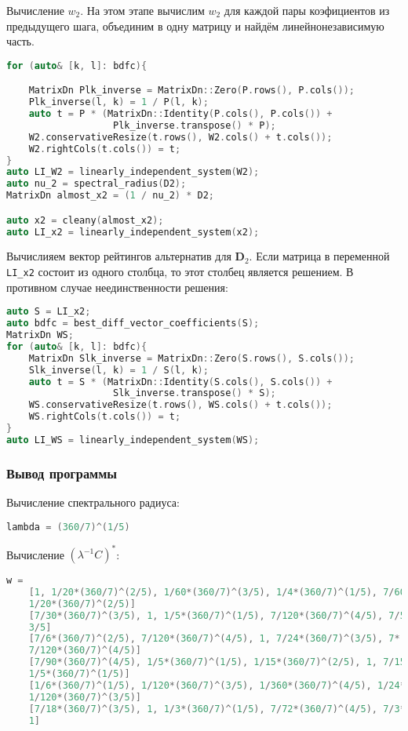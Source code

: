 \documentclass[specialist,
	substylefile = spbu.rtx,
	subf,href,colorlinks=true, 12pt]{disser}
\begin{document}
Вычисление $w_2$. На этом этапе вычислим $w_{2}$ для каждой пары коэфициентов из предыдущего шага, объединим в одну матрицу и найдём линейнонезависимую часть.
\begin{lstlisting}[language=c++,basicstyle=\footnotesize\ttfamily]
for (auto& [k, l]: bdfc){

    MatrixDn Plk_inverse = MatrixDn::Zero(P.rows(), P.cols());
    Plk_inverse(l, k) = 1 / P(l, k);
    auto t = P * (MatrixDn::Identity(P.cols(), P.cols()) +
                   Plk_inverse.transpose() * P);
    W2.conservativeResize(t.rows(), W2.cols() + t.cols());
    W2.rightCols(t.cols()) = t;
}
auto LI_W2 = linearly_independent_system(W2);
auto nu_2 = spectral_radius(D2);
MatrixDn almost_x2 = (1 / nu_2) * D2;

auto x2 = cleany(almost_x2);
auto LI_x2 = linearly_independent_system(x2);
\end{lstlisting}

Вычислияем вектор рейтингов альтернатив для $\mathbf{D}_2$.
Если матрица в переменной \texttt{LI\_x2} состоит из одного столбца, то этот столбец является решением. В противном случае неединственности решения:

\begin{lstlisting}[language=c++,basicstyle=\footnotesize\ttfamily]
auto S = LI_x2;
auto bdfc = best_diff_vector_coefficients(S);
MatrixDn WS;
for (auto& [k, l]: bdfc){
    MatrixDn Slk_inverse = MatrixDn::Zero(S.rows(), S.cols());
    Slk_inverse(l, k) = 1 / S(l, k);
    auto t = S * (MatrixDn::Identity(S.cols(), S.cols()) +
                   Slk_inverse.transpose() * S);
    WS.conservativeResize(t.rows(), WS.cols() + t.cols());
    WS.rightCols(t.cols()) = t;
}
auto LI_WS = linearly_independent_system(WS);
\end{lstlisting}

\subsubsection{Вывод программы}

Вычисление  спектрального радиуса:
\begin{lstlisting}[language=c++,basicstyle=\footnotesize\ttfamily]
	lambda = (360/7)^(1/5)
\end{lstlisting}

Вычисление $(\lambda^{-1}C)^*$:
\begin{lstlisting}[language=c++,basicstyle=\scriptsize\ttfamily]
	w = 
	[1, 1/20*(360/7)^(2/5), 1/60*(360/7)^(3/5), 1/4*(360/7)^(1/5), 7/60*(360/7)^(4/5), 
	1/20*(360/7)^(2/5)]
	[7/30*(360/7)^(3/5), 1, 1/5*(360/7)^(1/5), 7/120*(360/7)^(4/5), 7/5*(360/7)^(2/5), 
	3/5]
	[7/6*(360/7)^(2/5), 7/120*(360/7)^(4/5), 1, 7/24*(360/7)^(3/5), 7*(360/7)^(1/5), 
	7/120*(360/7)^(4/5)]
	[7/90*(360/7)^(4/5), 1/5*(360/7)^(1/5), 1/15*(360/7)^(2/5), 1, 7/15*(360/7)^(3/5), 
	1/5*(360/7)^(1/5)]
	[1/6*(360/7)^(1/5), 1/120*(360/7)^(3/5), 1/360*(360/7)^(4/5), 1/24*(360/7)^(2/5), 1, 
	1/120*(360/7)^(3/5)]
	[7/18*(360/7)^(3/5), 1, 1/3*(360/7)^(1/5), 7/72*(360/7)^(4/5), 7/3*(360/7)^(2/5), 
	1]
\end{lstlisting}
\end{document}
